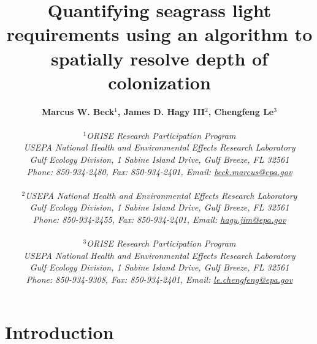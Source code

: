 \documentclass[letterpaper,12pt,oneside]{article}\usepackage[]{graphicx}\usepackage[]{color}
\begin{document}
\raggedbottom
\linenumbers
\raggedright
{}
\setlength{\parindent}{0.5in}
\renewcommand\refname{References \vspace{12pt}}

\begin{singlespace}
\title{{\bf {\Large Quantifying seagrass light requirements using an algorithm to spatially resolve depth of colonization}}}
\author{
  {\bf {\normalsize Marcus W. Beck$^1$, James D. Hagy III$^2$, Chengfeng Le$^3$}}
  \\\\{\textit {\normalsize $^1$ORISE Research Participation Program}}
  \\{\textit {\normalsize USEPA National Health and Environmental Effects Research Laboratory}}
  \\{\textit {\normalsize Gulf Ecology Division, 1 Sabine Island Drive, Gulf Breeze, FL 32561}}
	\\{\textit {\normalsize Phone: 850-934-2480, Fax: 850-934-2401, Email: \href{mailto:beck.marcus@epa.gov}{beck.marcus@epa.gov}}}
  \\\\{\textit {\normalsize $^2$USEPA National Health and Environmental Effects Research Laboratory}}
	\\{\textit {\normalsize Gulf Ecology Division, 1 Sabine Island Drive, Gulf Breeze, FL 32561}}
	\\{\textit {\normalsize Phone: 850-934-2455, Fax: 850-934-2401, Email: \href{mailto:hagy.jim@epa.gov}{hagy.jim@epa.gov}}}
  \\\\{\textit {\normalsize $^3$ORISE Research Participation Program}}
  \\{\textit {\normalsize USEPA National Health and Environmental Effects Research Laboratory}}
  \\{\textit {\normalsize Gulf Ecology Division, 1 Sabine Island Drive, Gulf Breeze, FL 32561}}
  \\{\textit {\normalsize Phone: 850-934-9308, Fax: 850-934-2401, Email: \href{mailto:le.chengfeng@epa.gov}{le.chengfeng@epa.gov}}}
	}
\date{}
\maketitle
\end{singlespace}
\clearpage

\section{Introduction}
\end{document}
